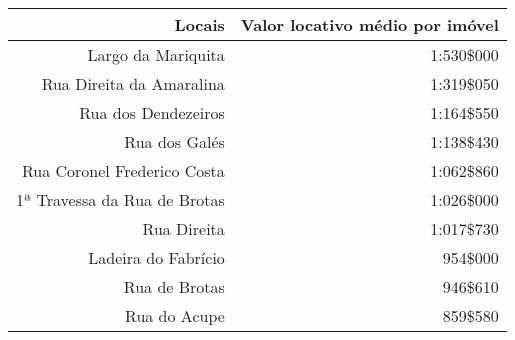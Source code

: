 \begin{table}[!htp]
{
\begin{tabular}{rr}
\toprule
Locais	&Valor locativo médio por imóvel\\
\midrule
\midrule
Largo da Mariquita	&1:530\$000\\
Rua Direita da Amaralina	&1:319\$050\\
Rua dos Dendezeiros	&1:164\$550\\
Rua dos Galés	&1:138\$430\\
Rua Coronel Frederico Costa	&1:062\$860\\
1ª Travessa da Rua de Brotas	&1:026\$000\\
Rua Direita	&1:017\$730\\
Ladeira do Fabrício	&954\$000\\
Rua de Brotas	&946\$610\\
Rua do Acupe	&859\$580\\
\bottomrule
\end{tabular} 
}
{}
\end{table}
